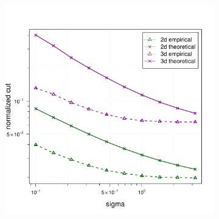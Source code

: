 \documentclass{article}
\newcommand{\1}{\mathbf{1}}
\theoremstyle{aldenthm}
\theoremstyle{aldenrmrk}
\begin{document}
\begin{figure}
\begin{adjustbox}{minipage=\linewidth}
\begin{subfigure}{.33\linewidth}
			\caption{}
		\end{subfigure}
		\begin{subfigure}{.33\linewidth}
			\includegraphics[width=\linewidth]{example1plots/sigma_normalized_cut_plot}
			\caption{}
		\end{subfigure}
		

\end{adjustbox}
\end{figure}
\end{document}
